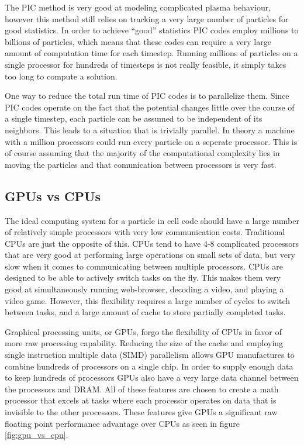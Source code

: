 	The PIC method is very good at modeling complicated plasma behaviour, however this method still relies on tracking a very large number of particles for good statistics. In order to achieve ``good'' statistics PIC codes employ millions to billions of particles, which means that these codes can require a very large amount of computation time for each timestep. Running millions of particles on a single processor for hundreds of timesteps is not really feasible, it simply takes too long to compute a solution. 
	
	One way to reduce the total run time of PIC codes is to parallelize them. Since PIC codes operate on the fact that the potential changes little over the course of a single timestep, each particle can be assumed to be independent of its neighbors. This leads to a situation that is trivially parallel. In theory a machine with a million processors could run every particle on a seperate processor. This is of course assuming that the majority of the computational complexity lies in moving the particles and that comunication between processors is very fast.  


		\subsection{GPUs vs CPUs}
	The ideal computing system for a particle in cell code should have a large number of relatively simple processors with very low communication costs. Traditional CPUs are just the opposite of this. CPUs tend to have 4-8 complicated processors that are very good at performing large operations on small sets of data, but very slow when it comes to communicating between multiple processors. CPUs are designed to be able to actively switch tasks on the fly. This makes them very good at simultaneously running web-browser, decoding a video, and playing a video game. However, this flexibility requires a large number of cycles to switch between tasks, and a large amount of cache to store partially completed tasks.

Graphical processing units, or GPUs, forgo the flexibility of CPUs in favor of more raw processing capability. Reducing the size of the cache and employing single instruction multiple data (SIMD) parallelism allows GPU manufactures to combine hundreds of processors on a single chip. In order to supply enough data to keep hundreds of processors GPUs also have a very large data channel between the processors and DRAM. All of these features are chosen to create a math processor that excels at tasks where each processor operates on data that is invisible to the other processors. These features give GPUs a significant raw floating point performance advantage over CPUs as seen in figure \ref{fig:gpu_vs_cpu}. 


